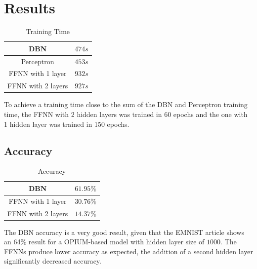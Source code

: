 \documentclass[a4paper, 11pt]{article}
\begin{document}
		
	\section{Results}
		
			\begin{table}[H]
				\centering
				\begin{tabular}{|c|c|}
					\hline
					DBN 					&  $ 474 s $    \\ \hline
					Perceptron 				&  $ 453 s $      \\ \hline
					FFNN with 1 layer		&  $ 932 s $     \\ \hline
					FFNN with 2 layers		&  $ 927 s $    \\ \hline
				\end{tabular}
				\caption{Training Time}
				\label{tab:Ttime}
			\end{table}
			To achieve a training time close to the sum of the DBN and Perceptron training time, the FFNN with 2 hidden layers was trained in 60 epochs and the one with 1 hidden layer was trained in 150 epochs.
			
		\subsection{Accuracy}
			\begin{table}[H]
				\centering
				\begin{tabular}{|c|c|}
					\hline
					DBN 					&  $ 61.95\% $    \\ \hline
					FFNN with 1 layer		&  $ 30.76\% $     \\ \hline
					FFNN with 2 layers		&  $ 14.37\% $    \\ \hline
				\end{tabular}
				\caption{Accuracy}
				\label{tab:acc}
			\end{table}
			The DBN accuracy is a very good result, given that the EMNIST article \cite{emnist} shows an 64\% result for a OPIUM-based model with hidden layer size of $ 1000 $.
			The FFNNs produce lower accuracy as expected, the addition of a second hidden layer significantly decreased accuracy. %
			
	
\end{document}
